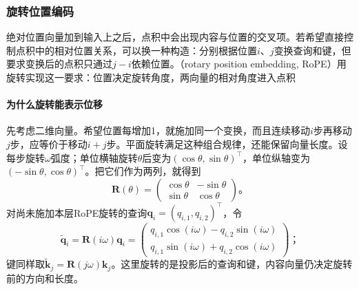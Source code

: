 \subsubsection{旋转位置编码}

绝对位置向量加到输入上之后，点积中会出现内容与位置的交叉项。若希望直接控制点积中的相对位置关系，可以换一种构造：分别根据位置$i$、$j$变换查询和键，但要求变换后的点积只通过$j-i$依赖位置。（rotary position embedding, RoPE）用旋转实现这一要求：位置决定旋转角度，两向量的相对角度进入点积

\paragraph{为什么旋转能表示位移}
先考虑二维向量。希望位置每增加1，就施加同一个变换，而且连续移动$i$步再移动$j$步，应等价于移动$i+j$步。平面旋转满足这种组合规律，还能保留向量长度。设每步旋转$\omega$弧度；单位横轴旋转$\theta$后变为$(\cos\theta,\sin\theta)^{\top}$，单位纵轴变为$(-\sin\theta,\cos\theta)^{\top}$。把它们作为两列，就得到
\begin{equation}
  \bm R(\theta)=
  \begin{pmatrix}
    \cos\theta&-\sin\theta\\
    \sin\theta&\cos\theta
  \end{pmatrix}\text{。}
  \label{eq:transformer-rope-rotation}
\end{equation}
对尚未施加本层RoPE旋转的查询$\bm q_i=(q_{i,1},q_{i,2})^{\top}$，令
\[
  \widetilde{\bm q}_i=\bm R(i\omega)\bm q_i
  =\begin{pmatrix}
     q_{i,1}\cos(i\omega)-q_{i,2}\sin(i\omega)\\
     q_{i,1}\sin(i\omega)+q_{i,2}\cos(i\omega)
   \end{pmatrix}\text{；}
\]
键同样取$\widetilde{\bm k}_j=\bm R(j\omega)\bm k_j$。这里旋转的是投影后的查询和键，内容向量仍决定旋转前的方向和长度。

